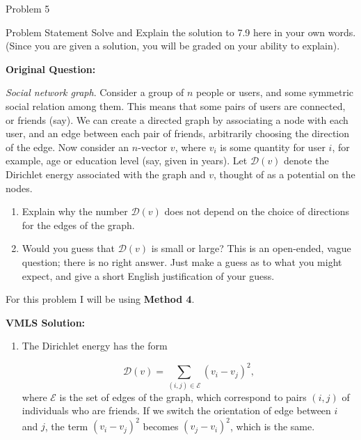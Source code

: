 \begin{problem}{Problem 5}
    \begin{statement}{Problem Statement}
        Solve and Explain the solution to 7.9 here in your own words. (Since you are given a solution, you will be graded on your ability to explain). \vspace*{1em}

        \noindent \textbf{Original Question:} \vspace*{1em}

        \textit{Social network graph}. Consider a group of $n$ people or users, and some symmetric social relation among them. This means that some pairs of users are connected, or friends (say). We can create 
        a directed graph by associating a node with each user, and an edge between each pair of friends, arbitrarily choosing the direction of the edge. Now consider an $n$-vector $v$, where $v_{i}$ 
        is some quantity for user $i$, for example, age or education level (say, given in years). Let $\mathcal{D}(v)$ denote the Dirichlet energy associated with the graph and $v$, thought of as a 
        potential on the nodes.

        \begin{enumerate}[label = (\alph*)]
            \item Explain why the number $\mathcal{D}(v)$ does not depend on the choice of directions for the edges of the graph.
            \item Would you guess that $\mathcal{D}(v)$ is small or large? This is an open-ended, vague question; there is no right answer. Just make a guess as to what you might expect, and give a 
            short English justification of your guess.
        \end{enumerate}
    \end{statement}

    \begin{highlight}
        For this problem I will be using \textbf{Method 4}. \vspace*{1em}

        \noindent \textbf{VMLS Solution:} 

        \begin{enumerate}[label = (\alph*)]
            \item The Dirichlet energy has the form
            
            \begin{equation*}
                \mathcal{D}(v) = \sum_{(i,j) \in \mathcal{E}} (v_{i} - v_{j})^{2},
            \end{equation*}
            where $\mathcal{E}$ is the set of edges of the graph, which correspond to pairs $(i, j)$ of individuals who are friends. If we switch the orientation of edge between $i$ and $j$, the term 
            $(v_{i} - v_{j})^{2}$ becomes $(v_{j} - v_{i})^{2}$, which is the same.
        \end{enumerate}


\end{highlight}
\end{problem}
